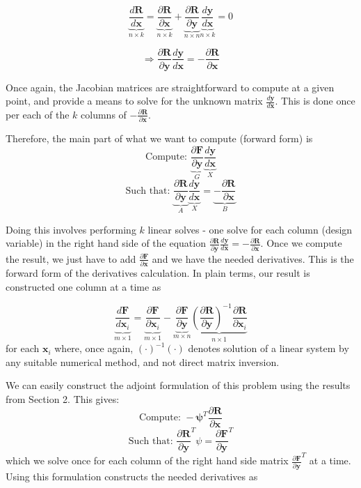 \documentclass{article}
\begin{document}
$$\underbrace{\frac{d \mathbf R}{d \mathbf x}}_{n \times k} = \underbrace{\frac{\partial \mathbf R}{\partial \mathbf x}}_{n \times k} + \underbrace{\frac{\partial \mathbf R}{\partial \mathbf y}}_{n \times n} \underbrace{\frac{d \mathbf y}{d \mathbf x}}_{n \times k}  = 0 $$

$$ \Rightarrow \frac{\partial \mathbf R}{\partial \mathbf y} \frac{d \mathbf y}{d \mathbf x} = - \frac{\partial \mathbf R}{\partial \mathbf x}$$

Once again, the Jacobian matrices are straightforward to compute at a given point, and provide a means to solve for the unknown matrix $\frac{d \mathbf y}{d \mathbf x}$. This is done once per each of the $k$ columns of $- \frac{\partial \mathbf R}{\partial \mathbf x}$.

Therefore, the main part of what we want to compute (forward form) is
$$\text{Compute: } \underbrace{\frac{\partial \mathbf F}{\partial \mathbf y}}_{G} \underbrace{\frac{d \mathbf y}{d \mathbf x}}_{X}$$
$$\text{Such that: } \underbrace{\frac{\partial \mathbf R}{\partial \mathbf y}}_{A} \underbrace{\frac{d \mathbf y}{d \mathbf x}}_{X} = \underbrace{- \frac{\partial \mathbf R}{\partial \mathbf x}}_{B}$$

Doing this involves performing $k$ linear solves - one solve for each column (design variable) in the right hand side of the equation $\frac{\partial \mathbf R}{\partial \mathbf y} \frac{d \mathbf y}{d \mathbf x} = - \frac{\partial \mathbf R}{\partial \mathbf x}$.
Once we compute the result, we just have to add $\frac{\partial \mathbf F}{\partial \mathbf x}$ and we have the needed derivatives. This is the forward form of the derivatives calculation. In plain terms, our result is constructed one column at a time as

$$ \underbrace{\frac{d \mathbf F}{d \mathbf x_i}}_{m \times 1} = \underbrace{\frac{\partial \mathbf F}{\partial \mathbf x_i}}_{m \times 1} - \underbrace{\frac{\partial \mathbf F}{\partial \mathbf y}}_{m \times n}\underbrace{\left(\frac{\partial \mathbf R}{\partial \mathbf y}  \right)^{-1} \frac{\partial \mathbf R}{\partial \mathbf x_i}}_{n \times 1}$$
for each $\mathbf {x}_i$ where, once again, $\left(\cdot\right)^{-1} \left(\cdot\right)$ denotes solution of a linear system by any suitable numerical method, and not direct matrix inversion. 

We can easily construct the adjoint formulation of this problem using the results from Section 2. This gives:
$$\text{Compute: } - \mathbf{\psi} ^T \frac{\partial \mathbf R}{\partial \mathbf x}$$
$$\text{Such that: } \frac{\partial \mathbf R}{\partial \mathbf y} ^T \psi  = \frac{\partial \mathbf F}{\partial \mathbf y} ^T $$
which we solve once for each column of the right hand side matrix $\frac{\partial \mathbf F}{\partial \mathbf y} ^T$ at a time.
Using this formulation constructs the needed derivatives as
\end{document}
